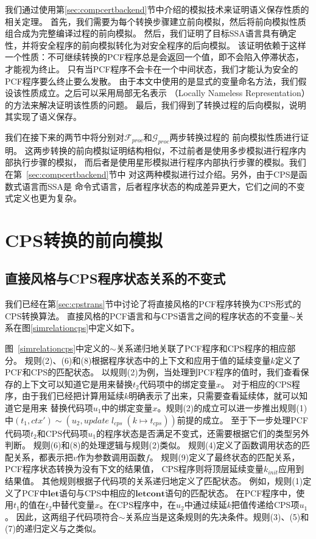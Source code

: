 我们通过使用第\ref{sec:compcertbackend}节中介绍的模拟技术来证明语义保存性质的相关定理。
首先，我们需要为每个转换步骤建立前向模拟，然后将前向模拟性质组合成为完整编译过程的前向模拟。
然后，我们证明了目标SSA语言具有确定性，并将安全程序的前向模拟转化为对安全程序的后向模拟。
该证明依赖于这样一个性质：不可继续转换的PCF程序总是会返回一个值，即不会陷入停滞状态，才能视为终止。
只有当PCF程序不会卡在一个中间状态，我们才能认为安全的PCF程序要么终止要么发散。
由于本文中使用的是显式的变量命名方法，我们假设该性质成立。之后可以采用局部无名表示
（Locally Nameless Representation）的方法来解决证明该性质的问题。
最后，我们得到了转换过程的后向模拟，说明其实现了语义保存。

我们在接下来的两节中将分别对$\mathcal{F}_{proc}$和$\mathcal{G}_{proc}$两步转换过程的
前向模拟性质进行证明。
这两步转换的前向模拟证明结构相似，不过前者是使用多步模拟进行程序内部执行步骤的模拟，
而后者是使用星形模拟进行程序内部执行步骤的模拟。我们在第~\ref{sec:compcertbackend}节中
对这两种模拟进行过介绍。另外，由于CPS是函数式语言而SSA是
命令式语言，后者程序状态的构成差异更大，它们之间的不变式定义也更为复杂。

\section{CPS转换的前向模拟} \label{sec:cpsforward}

\subsection{直接风格与CPS程序状态关系的不变式}

我们已经在第\ref{sec:cpstrans}节中讨论了将直接风格的PCF程序转换为CPS形式的CPS转换算法。
直接风格的PCF语言和与CPS语言之间的程序状态的不变量$\sim$关系在图\ref{simrelationcps}中定义如下。

图~\ref{simrelationcps}中定义的$\sim$关系递归地关联了PCF程序和CPS程序的相应部分。
规则(2)、(6)和(8)根据程序状态中的上下文和应用于值的延续变量$k$定义了PCF和CPS的匹配状态。
以规则(2)为例，当处理到PCF程序的值时，我们查看保存的上下文可以知道它是用来替换$t_2$代码项中的绑定变量$x$。
对于相应的CPS程序，由于我们已经把计算用延续$k$明确表示了出来，只需要查看延续体，就可以知道它是用来
替换代码项$u_1$中的绑定变量$x$。规则(2)的成立可以进一步推出规则(1)
中$(t_1, c t x') \sim (u_2, u p d a t e\; l_{c p s}\; (k \mapsto t_{c p s}))$前提的成立。
至于下一步处理PCF代码项$t_2$和CPS代码项$u_1$的程序状态是否满足不变式，还需要根据它们的类型另外判断。
规则(6)和(8)的处理逻辑与规则(2)类似。
规则(4)定义了函数调用状态的匹配关系，都表示把$v$作为参数调用函数$f$。
规则(9)定义了最终状态的匹配关系，PCF程序状态转换为没有下文的结果值，
CPS程序则将顶层延续变量$k_{init}$应用到结果值。
其他规则根据子代码项的关系递归地定义了匹配状态。
例如，规则(1)定义了PCF中$\mathbf{let}$语句与CPS中相应的$\mathbf{letcont}$语句的匹配状态。
在PCF程序中，使用$t_1$的值在$t_2$中替代变量$x$。在CPS程序中，在$u_2$中通过续延$k$把值传递给CPS项$u_1$。
因此，这两组子代码项符合$\sim$关系应当是这条规则的先决条件。规则(3)、(5)和(7)的递归定义与之类似。

